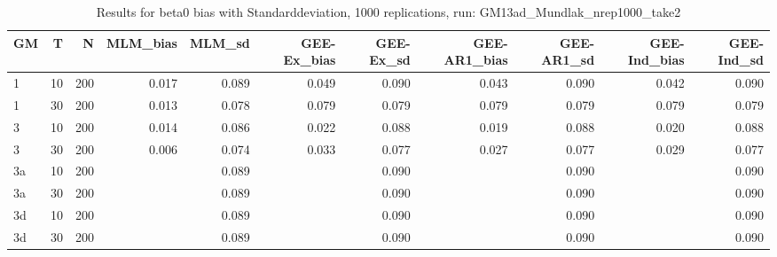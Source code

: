 \begin{table}[ht]
\centering
\begin{tabular}{lrrrrrrrrrr}
  \hline
GM & T & N & MLM\_bias & MLM\_sd & GEE-Ex\_bias & GEE-Ex\_sd & GEE-AR1\_bias & GEE-AR1\_sd & GEE-Ind\_bias & GEE-Ind\_sd \\ 
  \hline
1 & 10 & 200 & 0.017 & 0.089 & 0.049 & 0.090 & 0.043 & 0.090 & 0.042 & 0.090 \\ 
  1 & 30 & 200 & 0.013 & 0.078 & 0.079 & 0.079 & 0.079 & 0.079 & 0.079 & 0.079 \\ 
  3 & 10 & 200 & 0.014 & 0.086 & 0.022 & 0.088 & 0.019 & 0.088 & 0.020 & 0.088 \\ 
  3 & 30 & 200 & 0.006 & 0.074 & 0.033 & 0.077 & 0.027 & 0.077 & 0.029 & 0.077 \\ 
  3a & 10 & 200 &  & 0.089 &  & 0.090 &  & 0.090 &  & 0.090 \\ 
  3a & 30 & 200 &  & 0.089 &  & 0.090 &  & 0.090 &  & 0.090 \\ 
  3d & 10 & 200 &  & 0.089 &  & 0.090 &  & 0.090 &  & 0.090 \\ 
  3d & 30 & 200 &  & 0.089 &  & 0.090 &  & 0.090 &  & 0.090 \\ 
   \hline
\end{tabular}
\caption{Results for beta0 bias with Standarddeviation, 1000 replications, run: GM13ad_Mundlak_nrep1000_take2} 
\label{tab:beta0_bias_sd}
\end{table}
